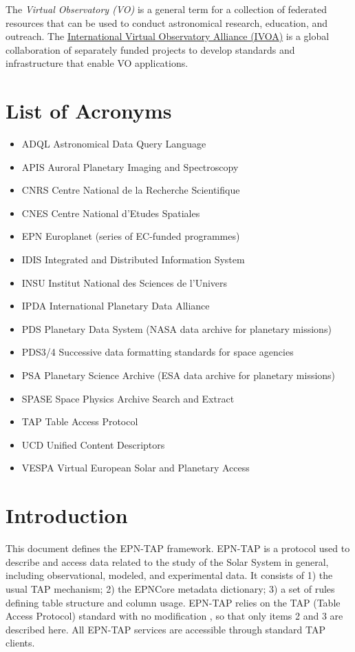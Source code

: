 \documentclass[11pt,a4paper]{ivoa}
\begin{document}
The \emph{Virtual Observatory (VO)} is a
general term for a collection of federated resources that can be used
to conduct astronomical research, education, and outreach.
The \href{http://www.ivoa.net}{International
Virtual Observatory Alliance (IVOA)} is a global
collaboration of separately funded projects to develop standards and
infrastructure that enable VO applications.

\section*{List of Acronyms}
\begin{itemize}
\item{ADQL} Astronomical Data Query Language
\item{APIS} Auroral Planetary Imaging and Spectroscopy
\item{CNRS} Centre National de la Recherche Scientifique
\item{CNES} Centre National d'Etudes Spatiales
\item{EPN} Europlanet (series of EC-funded programmes)
\item{IDIS} Integrated and Distributed Information System
\item{INSU} Institut National des Sciences de l'Univers
\item{IPDA} International Planetary Data Alliance
\item{PDS} Planetary Data System (NASA data archive for planetary missions)
\item{PDS3/4} Successive data formatting standards for space agencies
\item{PSA} Planetary Science Archive (ESA data archive for planetary missions)
\item{SPASE} Space Physics Archive Search and Extract
\item{TAP} Table Access Protocol
\item{UCD} Unified Content Descriptors
\item{VESPA} Virtual European Solar and Planetary Access
\end{itemize}

\section{Introduction}


This document defines the EPN-TAP framework. EPN-TAP is a protocol
used to describe and access data related to the study of the Solar
System in general, including observational, modeled, and experimental
data. It consists of 1) the usual TAP mechanism; 2) the EPNCore metadata
dictionary; 3) a set of rules defining table structure and column
usage. EPN-TAP relies on the TAP (Table Access Protocol) standard with
no modification \citep{2019ivoa.spec.0927D}, so that only items 2 and 3
are described here.
All EPN-TAP services are accessible through standard TAP clients.
\end{document}
